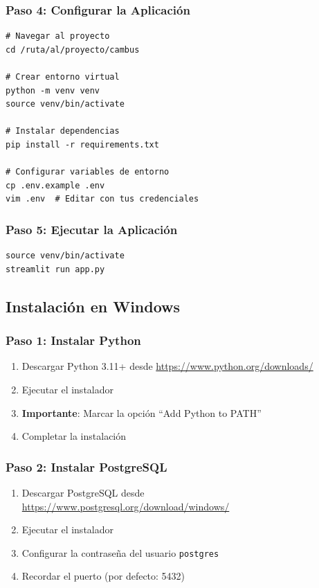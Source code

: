 \documentclass[12pt,a4paper]{article}
\begin{document}
\subsubsection{Paso 4: Configurar la Aplicación}

\begin{lstlisting}[style=bash]
# Navegar al proyecto
cd /ruta/al/proyecto/cambus

# Crear entorno virtual
python -m venv venv
source venv/bin/activate

# Instalar dependencias
pip install -r requirements.txt

# Configurar variables de entorno
cp .env.example .env
vim .env  # Editar con tus credenciales
\end{lstlisting}

\subsubsection{Paso 5: Ejecutar la Aplicación}

\begin{lstlisting}[style=bash]
source venv/bin/activate
streamlit run app.py
\end{lstlisting}

\subsection{Instalación en Windows}

\subsubsection{Paso 1: Instalar Python}

\begin{enumerate}
    \item Descargar Python 3.11+ desde \url{https://www.python.org/downloads/}
    \item Ejecutar el instalador
    \item \textbf{Importante}: Marcar la opción ``Add Python to PATH''
    \item Completar la instalación
\end{enumerate}

\subsubsection{Paso 2: Instalar PostgreSQL}

\begin{enumerate}
    \item Descargar PostgreSQL desde \url{https://www.postgresql.org/download/windows/}
    \item Ejecutar el instalador
    \item Configurar la contraseña del usuario \texttt{postgres}
    \item Recordar el puerto (por defecto: 5432)
\end{enumerate}
\end{document}
